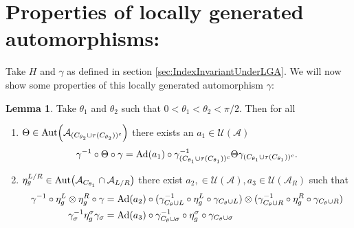 \documentclass[12pt,a4paper,twoside]{article}
\let\originalleft\left
\let\originalright\right
\renewcommand{\left}{\mathopen{}\mathclose\bgroup\originalleft}
\renewcommand{\right}{\aftergroup\egroup\originalright}
\newcommand{\UU}{\mathcal U}
\renewcommand{\AA}{\mathcal A}
\newcommand{\Ad}[1]{\textrm{Ad}\left(#1\right)}
\newcommand{\Aut}[1]{\textrm{Aut}\left(#1\right)}
\theoremstyle{definition}
\newtheorem{lemma}[theorem]{Lemma}
\numberwithin{equation}{section}
\begin{document}
\section{Properties of locally generated automorphisms:}
 Take $H$ and $\gamma$ as defined in section \ref{sec:IndexInvariantUnderLGA}. We will now show some properties of this locally generated automorphism $\gamma$:
\begin{lemma}\label{lem:TwoAngleLemma}
	Take $\theta_1$ and $\theta_2$ such that $0<\theta_1<\theta_2<\pi/2$. Then for all
	\begin{enumerate}
		\item $\Theta\in\Aut{\AA_{(C_{\theta_2}\cup \tau(C_{\theta_2}))^c}}$ there exists an $a_1\in\UU(\AA)$
		\begin{equation}\label{eq:TwoAngleLemmaEquation1}
			\gamma^{-1}\circ\Theta\circ\gamma=\Ad{a_1}\circ\gamma_{(C_{\theta_1}\cup \tau(C_{\theta_1}))^c}^{-1}\Theta\gamma_{(C_{\theta_1}\cup \tau(C_{\theta_1}))^c}.
		\end{equation}
		\item $\eta_{g}^{L/R}\in\Aut{\AA_{C_{\theta_1}}\cap\AA_{L/R}}$ there exist $a_2,\in\UU(\AA),a_3\in\UU(\AA_R)$ such that
		\begin{align}
			\gamma^{-1}\circ\eta_{g}^L\otimes\eta_{g}^R\circ\gamma&=\Ad{a_2}\circ(\gamma_{C_\theta\cup L}^{-1}\circ \eta_{g}^L \circ\gamma_{C_\theta\cup L})\otimes(\gamma_{C_\theta\cup R}^{-1}\circ\eta_{g}^R\circ\gamma_{C_\theta\cup R})\\
			\gamma_\sigma^{-1}\eta_g^\sigma\gamma_\sigma&=\Ad{a_3}\circ \gamma_{C_\theta\cup \sigma}^{-1}\circ \eta_{g}^\sigma \circ\gamma_{C_\theta\cup \sigma}
		\end{align}
	\end{enumerate}
\end{lemma}
\end{document}

